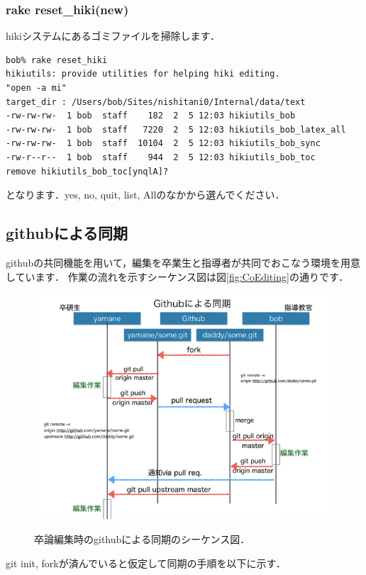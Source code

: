 \subsubsection{rake reset\_hiki(new)}
hikiシステムにあるゴミファイルを掃除します．
\begin{lstlisting}[style=customCsh,basicstyle={\scriptsize\ttfamily}]
bob% rake reset_hiki
hikiutils: provide utilities for helping hiki editing.
"open -a mi"
target_dir : /Users/bob/Sites/nishitani0/Internal/data/text
-rw-rw-rw-  1 bob  staff    182  2  5 12:03 hikiutils_bob
-rw-rw-rw-  1 bob  staff   7220  2  5 12:03 hikiutils_bob_latex_all
-rw-rw-rw-  1 bob  staff  10104  2  5 12:03 hikiutils_bob_sync
-rw-r--r--  1 bob  staff    944  2  5 12:03 hikiutils_bob_toc
remove hikiutils_bob_toc[ynqlA]?
\end{lstlisting}
となります．yes, no, quit, list, Allのなかから選んでください．

\subsection{githubによる同期}
githubの共同機能を用いて，編集を卒業生と指導者が共同でおこなう環境を用意しています．
作業の流れを示すシーケンス図は図\ref{fig:CoEditing}の通りです．

\begin{figure}[htbp]\begin{center}
\includegraphics[width=12cm,bb= 0 0 737 553]{../figs/./hikiutils_bob.005.jpeg}
\caption{卒論編集時のgithubによる同期のシーケンス図．}
\label{fig:CoEditing}
\label{default}\end{center}\end{figure}
git init, forkが済んでいると仮定して同期の手順を以下に示す．

